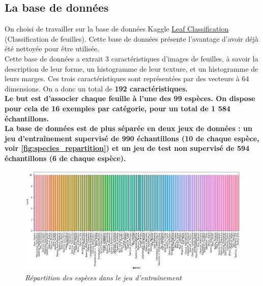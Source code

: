\subsection{La base de données}

On choisi de travailler sur la base de données Kaggle \href{https://www.kaggle.com/competitions/leaf-classification}{Leaf Classification} (Classification de feuilles). Cette base de données présente l'avantage d'avoir déjà été nettoyée pour être utilisée.\\

Cette base de données a extrait 3 caractéristiques d'images de feuilles, à savoir la description de leur forme, un histogramme de leur texture, et un histogramme de leurs marges. Ces trois caractéristiques sont représentées par des vecteurs à 64 dimensions. On a donc un total de \bf{192 caractéristiques}.\\

Le but est d'associer chaque feuille à l'une des \bf{99 espèces}. On dispose pour cela de 16 exemples par catégorie, pour un total de \bf{1 584 échantillons}.\\

La base de données est de plus séparée en deux jeux de données : un jeu d'entraînement supervisé de \bf{990 échantillons} (10 de chaque espèce, voir \autoref{fig:species_repartition}) et un jeu de test non supervisé de \bf{594 échantillons} (6 de chaque espèce).

\begin{figure}[h]
    \centering
    \includegraphics[scale=0.48]{Images/graphiques/species_repartition.png}
    \caption{\it{Répartition des espèces dans le jeu d'entraînement}}
    \label{fig:species_repartition}
\end{figure}